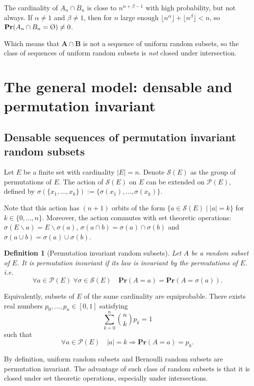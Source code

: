 \documentclass{article}
\newcommand{\vide}{\textup{\O}}
\newcommand{\bs}{\boldsymbol}
\def\Pr{\mathbf{Pr}}
\newcommand\flr[1]{\lfloor #1 \rfloor}
\newtheorem{defi}[thm]{Definition}
\theoremstyle{remark}
\begin{document}
The cardinality of $A_n\cap B_n$ is close to $n^{\alpha+\beta-1}$ with high probability, but not always. If $\alpha\neq 1$ and $\beta\neq 1$, then for $n$ large enough $\flr{n^\alpha} + \flr{n^\beta} < n$, so $\Pr(A_n\cap B_n = \vide)\neq 0$.

Which means that $\bs A\cap \bs B$ is not a sequence of uniform random subsets, so the class of sequences of uniform random subsets is \textit{not} closed under intersection.

\section{The general model: densable and permutation invariant}
\subsection{Densable sequences of permutation invariant random subsets}

Let $E$ be a finite set with cardinality $|E| = n$. Denote $\mathcal{S}(E)$ as the group of permutations of $E$. The action of $\mathcal{S}(E)$ on $E$ can be extended on $\mathcal{P}(E)$, defined by $\sigma(\{x_1,\dots,x_k\}) := \{\sigma(x_1),\dots, \sigma(x_k)\}$.

Note that this action has $(n+1)$ orbits of the form $\{a\in \mathcal{S}(E)\mid |a| = k\}$ for $k \in \{ 0,\dots,n\}$. Moreover, the action commutes with set theoretic operations: $\sigma(E\backslash a) = E\backslash \sigma(a)$, $\sigma(a\cap b) = \sigma(a)\cap\sigma(b)$ and $\sigma(a\cup b) = \sigma(a)\cup\sigma(b)$.

\begin{defi}[Permutation invariant random subsets]\quad
Let $A$ be a random subset of $E$. It is permutation invariant if its law is invariant by the permutations of $E$. i.e.
    \[\forall a\in \mathcal{P}(E)\;\forall \sigma\in\mathcal{S}(E)\quad \Pr(A = a) = \Pr(A = \sigma(a)).\]
\end{defi}

Equivalently, subsets of $E$ of the same cardinality are equiprobable. There exists real numbers $p_0,\dots,p_n\in [0,1]$ satisfying 
\[\sum_{k=0}^n\binom{n}{k} p_k= 1\] such that
    \[\forall a\in\mathcal{P}(E) \quad |a|= k\Rightarrow\Pr(A = a) = p_k.\]

By definition, uniform random subsets and Bernoulli random subsets are permutation invariant. The advantage of such class of random subsets is that it is closed under set theoretic operations, especially under intersections.
\end{document}
